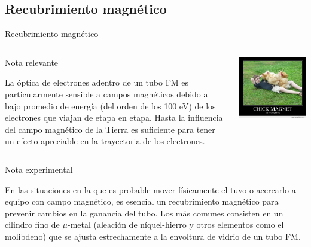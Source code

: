 \documentclass[a4paper,10pt]{beamer}
\begin{document}
\subsection{Recubrimiento magnético}
\begin{frame}{Recubrimiento magnético}
 
 
 \begin{columns}[c]
 
\column{2in}
 \begin{block}{Nota relevante}
  \begin{justify}
  \footnotesize
   La óptica de electrones adentro de un tubo FM es particularmente sensible a campos 
   magnéticos debido al bajo promedio de energía (del orden de los 100 eV) de los 
   electrones que viajan de etapa en etapa. Hasta la influencia del campo magnético 
   de la Tierra es suficiente para tener un efecto apreciable en la trayectoria de 
   los electrones.
  \end{justify}
  \end{block}
    
  \column{2in}
  
  \includegraphics[scale=0.25]{fig31}

   \end{columns}
   
   
  \begin{exampleblock}{Nota experimental}
   \begin{justify}
    En las situaciones en la que es probable mover físicamente el tuvo o 
    acercarlo a equipo con campo magnético, es esencial un recubrimiento magnético 
    para prevenir cambios en la ganancia del tubo. Los más comunes consisten 
    en un cilindro fino de $\mu$-metal (aleación de níquel-hierro y otros elementos 
    como el molibdeno) que se ajusta estrechamente a la envoltura de vidrio de 
    un tubo FM.
   \end{justify}
    \end{exampleblock}

\end{frame}
\end{document}

